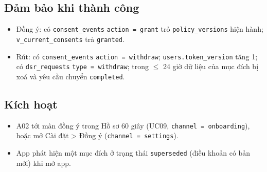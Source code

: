 \subsection{Đảm bảo khi thành công}
\begin{itemize}
\item Đồng ý: có {\small\texttt{consent\_\allowbreak{}\allowbreak{}events}} {\small\texttt{action = grant}} trỏ {\small\texttt{policy\_\allowbreak{}\allowbreak{}versions}} hiện hành; {\small\texttt{v\_\allowbreak{}\allowbreak{}current\_\allowbreak{}\allowbreak{}consents}} trả {\small\texttt{granted}}.
\item Rút: có {\small\texttt{consent\_\allowbreak{}\allowbreak{}events}} {\small\texttt{action = withdraw}}; {\small\texttt{users.\allowbreak{}token\_\allowbreak{}\allowbreak{}version}} tăng 1; có {\small\texttt{dsr\_\allowbreak{}\allowbreak{}requests}} {\small\texttt{type = withdraw}}; trong \ensuremath{\leq} 24 giờ dữ liệu của mục đích bị xoá và yêu cầu chuyển {\small\texttt{completed}}.
\end{itemize}
\subsection{Kích hoạt}
\begin{itemize}
\item A02 tới màn đồng ý trong Hồ sơ 60 giây (UC09, {\small\texttt{channel = onboarding}}), hoặc mở Cài đặt > Đồng ý ({\small\texttt{channel = settings}}).
\item App phát hiện một mục đích ở trạng thái {\small\texttt{superseded}} (điều khoản có bản mới) khi mở app.
\end{itemize}
